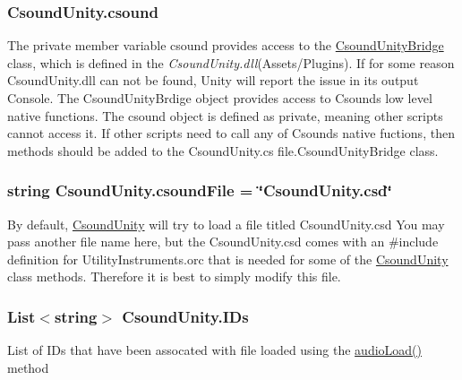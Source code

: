 \subsubsection[{csound}]{ Csound\+Unity.\+csound\hspace{0.3cm}{\ttfamily [private]}}\label{class_csound_unity_ab048ec161ff3c72eeded70d692e28e7a}
The private member variable csound provides access to the \hyperlink{class_csound_unity_bridge}{Csound\+Unity\+Bridge} class, which is defined in the {\itshape Csound\+Unity.\+dll}(Assets/\+Plugins). If for some reason Csound\+Unity.\+dll can not be found, Unity will report the issue in its output Console. The Csound\+Unity\+Brdige object provides access to Csounds low level native functions. The csound object is defined as private, meaning other scripts cannot access it. If other scripts need to call any of Csounds native fuctions, then methods should be added to the Csound\+Unity.\+cs file.\+Csound\+Unity\+Bridge class. \hypertarget{class_csound_unity_af1554e17f6554a2b17d0b25c1e477b4f}{}
\subsubsection[{csound\+File}]{\setlength{\rightskip}{0pt plus 5cm}string Csound\+Unity.\+csound\+File = \char`\"{}Csound\+Unity.\+csd\char`\"{}}\label{class_csound_unity_af1554e17f6554a2b17d0b25c1e477b4f}
By default, \hyperlink{class_csound_unity}{Csound\+Unity} will try to load a file titled Csound\+Unity.\+csd You may pass another file name here, but the Csound\+Unity.\+csd comes with an \#include definition for Utility\+Instruments.\+orc that is needed for some of the \hyperlink{class_csound_unity}{Csound\+Unity} class methods. Therefore it is best to simply modify this file. \hypertarget{class_csound_unity_a7b8bf3df0f6b36a6509c45d71b1f202d}{}
\subsubsection[{I\+Ds}]{\setlength{\rightskip}{0pt plus 5cm}List$<$string$>$ Csound\+Unity.\+I\+Ds\hspace{0.3cm}{\ttfamily [private]}}\label{class_csound_unity_a7b8bf3df0f6b36a6509c45d71b1f202d}
List of I\+Ds that have been assocated with file loaded using the \hyperlink{class_csound_unity_a5c571bca9cfc3628f977a16c2d56a48f}{audio\+Load()} method \hypertarget{class_csound_unity_a82c718d7b9393a4afb5d231e0bbef663}{}
